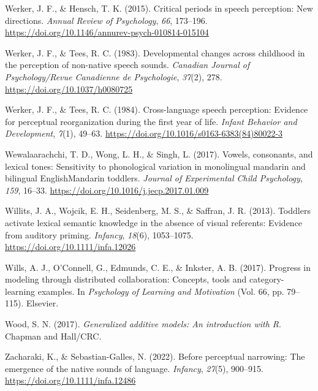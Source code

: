 \documentclass[
  12pt,
  b5paperpaper,
  twoside]{scrreprt}
\newlength{\cslhangindent}
\newlength{\cslentryspacingunit} %
\newenvironment{CSLReferences}[2] %
 {%
  \setlength{\parindent}{0pt}
  \ifodd #1
  \let\oldpar\par
  \def\par{\hangindent=\cslhangindent\oldpar}
  \fi
  \setlength{\parskip}{#2\cslentryspacingunit}
 }%
 {}
\begin{document}
\begin{CSLReferences}{1}{0}
\leavevmode{}%
Werker, J. F., \& Hensch, T. K. (2015). Critical periods in speech
perception: New directions. \emph{Annual Review of Psychology},
\emph{66}, 173--196.
\url{https://doi.org/10.1146/annurev-psych-010814-015104}

\leavevmode{}%
Werker, J. F., \& Tees, R. C. (1983). Developmental changes across
childhood in the perception of non-native speech sounds. \emph{Canadian
Journal of Psychology/Revue Canadienne de Psychologie}, \emph{37}(2),
278. \url{https://doi.org/10.1037/h0080725}

\leavevmode{}%
Werker, J. F., \& Tees, R. C. (1984). Cross-language speech perception:
Evidence for perceptual reorganization during the first year of life.
\emph{Infant Behavior and Development}, \emph{7}(1), 49--63.
\url{https://doi.org/10.1016/s0163-6383(84)80022-3}

\leavevmode{}%
Wewalaarachchi, T. D., Wong, L. H., \& Singh, L. (2017). Vowels,
consonants, and lexical tones: Sensitivity to phonological variation in
monolingual mandarin and bilingual {English}{\textendash}{Mandarin}
toddlers. \emph{Journal of Experimental Child Psychology}, \emph{159},
16--33. \url{https://doi.org/10.1016/j.jecp.2017.01.009}

\leavevmode{}%
Willits, J. A., Wojcik, E. H., Seidenberg, M. S., \& Saffran, J. R.
(2013). Toddlers activate lexical semantic knowledge in the absence of
visual referents: Evidence from auditory priming. \emph{Infancy},
\emph{18}(6), 1053--1075. \url{https://doi.org/10.1111/infa.12026}

\leavevmode{}%
Wills, A. J., O'Connell, G., Edmunds, C. E., \& Inkster, A. B. (2017).
Progress in modeling through distributed collaboration: Concepts, tools
and category-learning examples. In \emph{Psychology of {Learning} and
{Motivation}} (Vol. 66, pp. 79--115). {Elsevier}.

\leavevmode{}%
Wood, S. N. (2017). \emph{Generalized additive models: An introduction
with {R}}. {Chapman and Hall/CRC}.

\leavevmode{}%
Zacharaki, K., \& Sebastian-Galles, N. (2022). Before perceptual
narrowing: The emergence of the native sounds of language.
\emph{Infancy}, \emph{27}(5), 900--915.
\url{https://doi.org/10.1111/infa.12486}


\end{CSLReferences}
\end{document}
